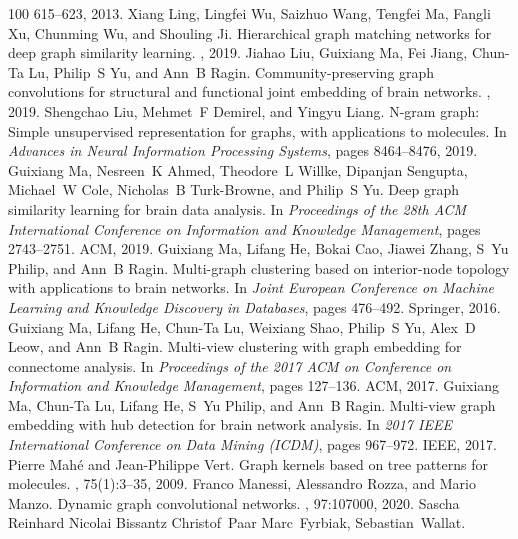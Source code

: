 \begin{thebibliography}{100}
  615--623, 2013.
Xiang Ling, Lingfei Wu, Saizhuo Wang, Tengfei Ma, Fangli Xu, Chunming Wu, and
  Shouling Ji.
\newblock Hierarchical graph matching networks for deep graph similarity
  learning.
, 2019.
Jiahao Liu, Guixiang Ma, Fei Jiang, Chun-Ta Lu, Philip~S Yu, and Ann~B Ragin.
\newblock Community-preserving graph convolutions for structural and functional
  joint embedding of brain networks.
, 2019.
Shengchao Liu, Mehmet~F Demirel, and Yingyu Liang.
\newblock N-gram graph: Simple unsupervised representation for graphs, with
  applications to molecules.
\newblock In {\em Advances in Neural Information Processing Systems}, pages
  8464--8476, 2019.
Guixiang Ma, Nesreen~K Ahmed, Theodore~L Willke, Dipanjan Sengupta, Michael~W
  Cole, Nicholas~B Turk-Browne, and Philip~S Yu.
\newblock Deep graph similarity learning for brain data analysis.
\newblock In {\em Proceedings of the 28th ACM International Conference on
  Information and Knowledge Management}, pages 2743--2751. ACM, 2019.
Guixiang Ma, Lifang He, Bokai Cao, Jiawei Zhang, S~Yu Philip, and Ann~B Ragin.
\newblock Multi-graph clustering based on interior-node topology with
  applications to brain networks.
\newblock In {\em Joint European Conference on Machine Learning and Knowledge
  Discovery in Databases}, pages 476--492. Springer, 2016.
Guixiang Ma, Lifang He, Chun-Ta Lu, Weixiang Shao, Philip~S Yu, Alex~D Leow,
  and Ann~B Ragin.
\newblock Multi-view clustering with graph embedding for connectome analysis.
\newblock In {\em Proceedings of the 2017 ACM on Conference on Information and
  Knowledge Management}, pages 127--136. ACM, 2017.
Guixiang Ma, Chun-Ta Lu, Lifang He, S~Yu Philip, and Ann~B Ragin.
\newblock Multi-view graph embedding with hub detection for brain network
  analysis.
\newblock In {\em 2017 IEEE International Conference on Data Mining (ICDM)},
  pages 967--972. IEEE, 2017.
Pierre Mah{\'e} and Jean-Philippe Vert.
\newblock Graph kernels based on tree patterns for molecules.
, 75(1):3--35, 2009.
Franco Manessi, Alessandro Rozza, and Mario Manzo.
\newblock Dynamic graph convolutional networks.
, 97:107000, 2020.
Sascha Reinhard Nicolai Bissantz Christof~Paar Marc~Fyrbiak, Sebastian~Wallat.

\end{thebibliography}
